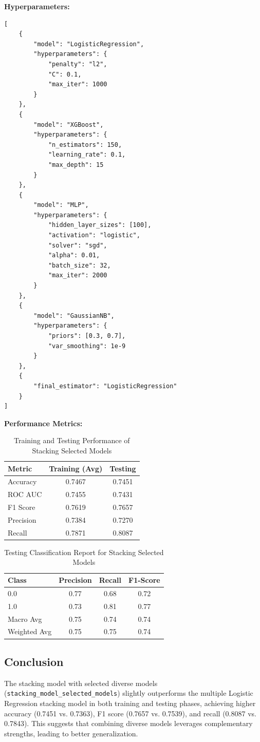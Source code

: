 \textbf{Hyperparameters:}
\begin{verbatim}
[
    {
        "model": "LogisticRegression",
        "hyperparameters": {
            "penalty": "l2",
            "C": 0.1,
            "max_iter": 1000
        }
    },
    {
        "model": "XGBoost",
        "hyperparameters": {
            "n_estimators": 150,
            "learning_rate": 0.1,
            "max_depth": 15
        }
    },
    {
        "model": "MLP",
        "hyperparameters": {
            "hidden_layer_sizes": [100],
            "activation": "logistic",
            "solver": "sgd",
            "alpha": 0.01,
            "batch_size": 32,
            "max_iter": 2000
        }
    },
    {
        "model": "GaussianNB",
        "hyperparameters": {
            "priors": [0.3, 0.7],
            "var_smoothing": 1e-9
        }
    },
    {
        "final_estimator": "LogisticRegression"
    }
]
\end{verbatim}

\textbf{Performance Metrics:}
\begin{table}[H]
\centering
\caption{Training and Testing Performance of Stacking Selected Models}
\begin{tabular}{|l|c|c|}
\hline
\textbf{Metric} & \textbf{Training (Avg)} & \textbf{Testing} \\ \hline
Accuracy & 0.7467 & 0.7451 \\ \hline
ROC AUC & 0.7455 & 0.7431 \\ \hline
F1 Score & 0.7619 & 0.7657 \\ \hline
Precision & 0.7384 & 0.7270 \\ \hline
Recall & 0.7871 & 0.8087 \\ \hline
\end{tabular}
\end{table}

\begin{table}[H]
\centering
\caption{Testing Classification Report for Stacking Selected Models}
\begin{tabular}{|l|c|c|c|}
\hline
\textbf{Class} & \textbf{Precision} & \textbf{Recall} & \textbf{F1-Score} \\ \hline
0.0 & 0.77 & 0.68 & 0.72 \\ \hline
1.0 & 0.73 & 0.81 & 0.77 \\ \hline
Macro Avg & 0.75 & 0.74 & 0.74 \\ \hline
Weighted Avg & 0.75 & 0.75 & 0.74 \\ \hline
\end{tabular}
\end{table}

\subsection{Conclusion}
The stacking model with selected diverse models (\texttt{stacking\_model\_selected\_models}) slightly outperforms the multiple Logistic Regression stacking model in both training and testing phases, achieving higher accuracy (0.7451 vs. 0.7363), F1 score (0.7657 vs. 0.7539), and recall (0.8087 vs. 0.7843). This suggests that combining diverse models leverages complementary strengths, leading to better generalization.